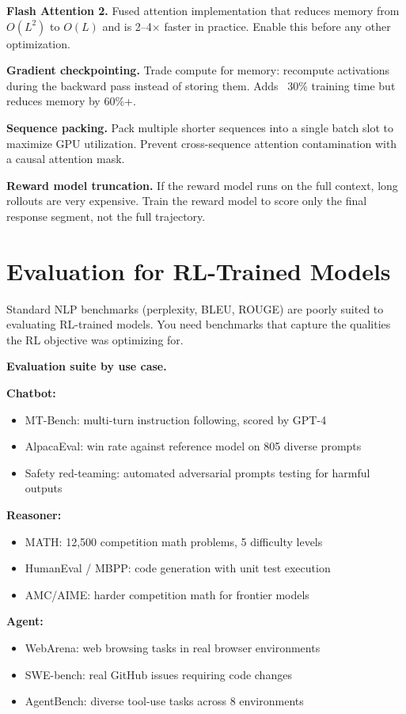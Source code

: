 \begin{chapterenv}
\begin{infobox}
\textbf{Flash Attention 2.} Fused attention implementation that reduces memory from $O(L^2)$ to $O(L)$ and is 2--4$\times$ faster in practice. Enable this before any other optimization.

\textbf{Gradient checkpointing.} Trade compute for memory: recompute activations during the backward pass instead of storing them. Adds ~30\% training time but reduces memory by 60\%+.

\textbf{Sequence packing.} Pack multiple shorter sequences into a single batch slot to maximize GPU utilization. Prevent cross-sequence attention contamination with a causal attention mask.

\textbf{Reward model truncation.} If the reward model runs on the full context, long rollouts are very expensive. Train the reward model to score only the final response segment, not the full trajectory.
\end{infobox}

\section{Evaluation for RL-Trained Models}

Standard NLP benchmarks (perplexity, BLEU, ROUGE) are poorly suited to evaluating RL-trained models. You need benchmarks that capture the qualities the RL objective was optimizing for.

\begin{infobox}
\textbf{Evaluation suite by use case.}

\textbf{Chatbot:}
\begin{itemize}
\item MT-Bench: multi-turn instruction following, scored by GPT-4
\item AlpacaEval: win rate against reference model on 805 diverse prompts
\item Safety red-teaming: automated adversarial prompts testing for harmful outputs
\end{itemize}

\textbf{Reasoner:}
\begin{itemize}
\item MATH: 12,500 competition math problems, 5 difficulty levels
\item HumanEval / MBPP: code generation with unit test execution
\item AMC/AIME: harder competition math for frontier models
\end{itemize}

\textbf{Agent:}
\begin{itemize}
\item WebArena: web browsing tasks in real browser environments
\item SWE-bench: real GitHub issues requiring code changes
\item AgentBench: diverse tool-use tasks across 8 environments
\end{itemize}
\end{infobox}


\end{chapterenv}
